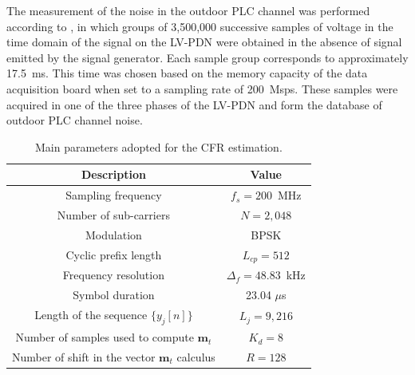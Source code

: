 \documentclass[journal]{IEEEtran}
\begin{document}
	The measurement of the noise in the outdoor PLC channel was performed according to \cite{Andrade2013}, in which groups of 3,500,000 successive samples of voltage in the time domain of the signal on the \ac{LV-PDN} were obtained in the absence of signal emitted by the signal generator. Each sample group corresponds to approximately 17.5~ms. This time was chosen based on the memory capacity of the data acquisition board when set to a sampling rate of 200~Msps. These samples were acquired in one of the three phases of the \ac{LV-PDN} and form the database of outdoor PLC channel noise.
	
	\begin{table}[!htp]
		\centering
		\caption{Main parameters adopted for the CFR estimation.}
		\label{tab:setup_parameters}
		\begin{tabular}{c|c}
			\hline\hline
			Description&Value\\
			\hline\hline
			Sampling frequency&$f_s=200$~MHz\\
			\hline
			Number of sub-carriers  &$N=2,048$ \\
			\hline
			Modulation         &BPSK \\
			\hline
			Cyclic prefix length       &$L_{cp}=512$ \\
			\hline
			Frequency resolution&$\Delta_f = 48.83$~kHz\\
			\hline
			Symbol duration & 23.04 $\mu$s \\
			\hline
			Length of the sequence $\{y_{j}[n]\}$    &$L_{j}=9,216$ \\
			\hline
			Number of samples used to compute $\textbf{m}_{t}$     &$K_{d}=8$ \\
			\hline
			Number of shift in the vector $\textbf{m}_{t}$  calculus       &$R=128$ \\
			\hline
		\end{tabular}
	\end{table}
	
\end{document}
